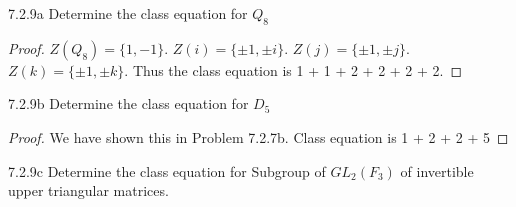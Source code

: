 \documentclass{article}
\begin{document}
\begin{PROB}{7.2.9a}\label{Problem 7.2.9a.}
    Determine the class equation for $Q_8$
\end{PROB}
\begin{proof}
    $Z(Q_8) = \{1, -1\}$. $Z(i) = \{\pm 1, \pm i\}$. $Z(j) = \{\pm 1, \pm j\}$. $Z(k) = \{\pm 1, \pm k\}$. Thus the class equation is 1 + 1 + 2 + 2 + 2 + 2.
\end{proof}
\begin{PROB}{7.2.9b}\label{Problem 7.2.9b.}
    Determine the class equation for $D_5$
\end{PROB}
\begin{proof}
    We have shown this in Problem 7.2.7b. Class equation is 1 + 2 + 2 + 5
\end{proof}
\begin{PROB}{7.2.9c}\label{Problem 7.2.9c.}
    Determine the class equation for Subgroup of $GL_2(F_3)$ of invertible upper triangular matrices.
\end{PROB}
\end{document}
